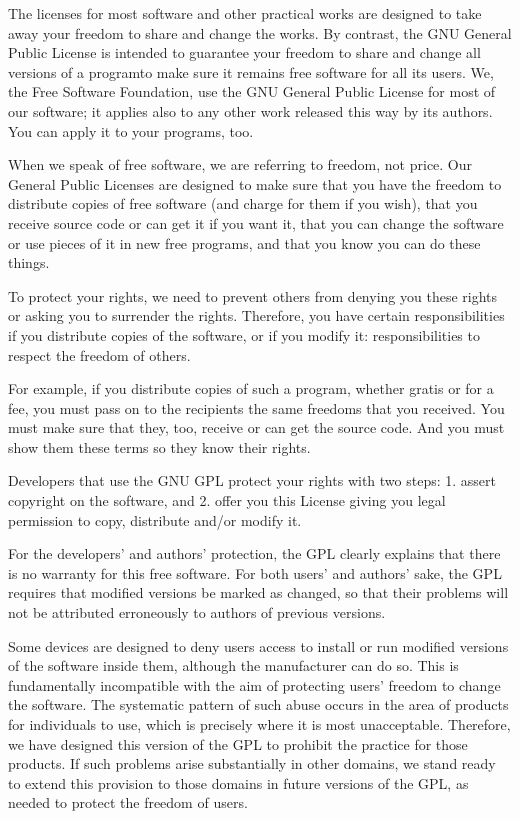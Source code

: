 \documentclass[letterpaper,10pt,english]{sphinxmanual}
\begin{document}
\sphinxAtStartPar
The licenses for most software and other practical works are designed to take away your freedom to share and change the works. By contrast, the GNU General Public License is intended to guarantee your freedom to share and change all versions of a program\textendash{}to make sure it remains free software for all its users. We, the Free Software Foundation, use the GNU General Public License for most of our software; it applies also to any other work released this way by its authors. You can apply it to your programs, too.

\sphinxAtStartPar
When we speak of free software, we are referring to freedom, not price. Our General Public Licenses are designed to make sure that you have the freedom to distribute copies of free software (and charge for them if you wish), that you receive source code or can get it if you want it, that you can change the software or use pieces of it in new free programs, and that you know you can do these things.

\sphinxAtStartPar
To protect your rights, we need to prevent others from denying you these rights or asking you to surrender the rights. Therefore, you have certain responsibilities if you distribute copies of the software, or if you modify it: responsibilities to respect the freedom of others.

\sphinxAtStartPar
For example, if you distribute copies of such a program, whether gratis or for a fee, you must pass on to the recipients the same freedoms that you received. You must make sure that they, too, receive or can get the source code. And you must show them these terms so they know their rights.

\sphinxAtStartPar
Developers that use the GNU GPL protect your rights with two steps:
1. assert copyright on the software, and
2. offer you this License giving you legal permission to copy, distribute and/or modify it.

\sphinxAtStartPar
For the developers’ and authors’ protection, the GPL clearly explains that there is no warranty for this free software. For both users’ and authors’ sake, the GPL requires that modified versions be marked as changed, so that their problems will not be attributed erroneously to authors of previous versions.

\sphinxAtStartPar
Some devices are designed to deny users access to install or run modified versions of the software inside them, although the manufacturer can do so. This is fundamentally incompatible with the aim of protecting users’ freedom to change the software. The systematic pattern of such abuse occurs in the area of products for individuals to use, which is precisely where it is most unacceptable. Therefore, we have designed this version of the GPL to prohibit the practice for those products. If such problems arise substantially in other domains, we stand ready to extend this provision to those domains in future versions of the GPL, as needed to protect the freedom of users.
\end{document}
